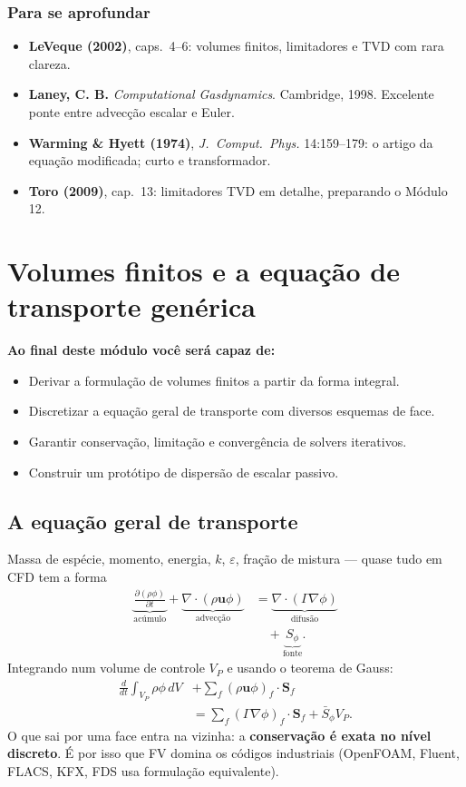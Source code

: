 \documentclass[10pt,a4paper,twocolumn,openany]{report}
\newenvironment{conceito}[1]{\section{#1}}{\par}
\newenvironment{aprofundar}{\subsection*{\textcolor{amarelo}{Para se aprofundar}}\small}{\par}
\newcommand{\objetivos}{\noindent\textbf{Ao final deste módulo você será capaz de:}}
\begin{document}
\begin{aprofundar}
\begin{itemize}[leftmargin=*]
  \item \textbf{LeVeque (2002)}, caps.\ 4--6: volumes finitos, limitadores e TVD com rara clareza.
  \item \textbf{Laney, C. B.} \emph{Computational Gasdynamics}. Cambridge, 1998. Excelente ponte entre advecção escalar e Euler.
  \item \textbf{Warming \& Hyett (1974)}, \emph{J.\ Comput.\ Phys.} 14:159--179: o artigo da equação modificada; curto e transformador.
  \item \textbf{Toro (2009)}, cap.\ 13: limitadores TVD em detalhe, preparando o Módulo 12.
\end{itemize}
\end{aprofundar}

\chapter{Volumes finitos e a equação de transporte genérica}

\objetivos
\begin{itemize}
  \item Derivar a formulação de volumes finitos a partir da forma integral.
  \item Discretizar a equação geral de transporte com diversos esquemas de face.
  \item Garantir conservação, limitação e convergência de solvers iterativos.
  \item Construir um protótipo de dispersão de escalar passivo.
\end{itemize}

\begin{conceito}{A equação geral de transporte}
Massa de espécie, momento, energia, $k$, $\varepsilon$, fração de mistura ---
quase tudo em CFD tem a forma
\begin{align*}
  \underbrace{\frac{\partial(\rho\phi)}{\partial t}}_{\text{acúmulo}}
  + \underbrace{\nabla\cdot(\rho\mathbf{u}\phi)}_{\text{advecção}}
  &= \underbrace{\nabla\cdot(\Gamma\nabla\phi)}_{\text{difusão}}\\
  &\quad + \underbrace{S_\phi}_{\text{fonte}} .
\end{align*}
Integrando num volume de controle $V_P$ e usando o teorema de Gauss:
\begin{align*}
  \frac{d}{dt}\int_{V_P}\rho\phi\,dV &+ \sum_{f}(\rho\mathbf{u}\phi)_f\cdot\mathbf{S}_f\\
  &= \sum_f(\Gamma\nabla\phi)_f\cdot\mathbf{S}_f + \bar S_\phi V_P .
\end{align*}
O que sai por uma face entra na vizinha: a \textbf{conservação é exata no
nível discreto}. É por isso que FV domina os códigos industriais (OpenFOAM,
Fluent, FLACS, KFX, FDS usa formulação equivalente).
\end{conceito}
\end{document}
